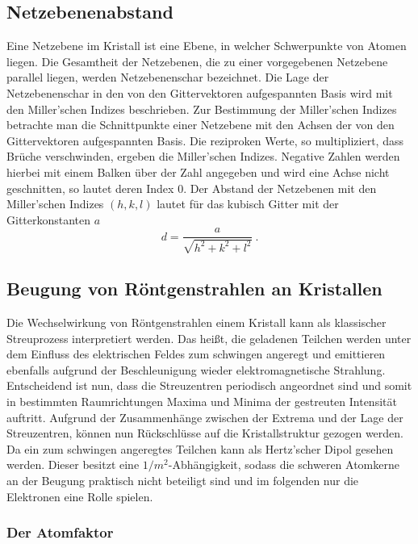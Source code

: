 \subsection{Netzebenenabstand}
\label{sub:netzebenenabstand}

Eine Netzebene im Kristall ist eine Ebene, in welcher Schwerpunkte von Atomen
liegen. Die Gesamtheit der Netzebenen, die zu einer vorgegebenen Netzebene
parallel liegen, werden Netzebenenschar bezeichnet. Die Lage der
Netzebenenschar in den von den Gittervektoren aufgespannten Basis wird mit den
Miller'schen Indizes beschrieben.
Zur Bestimmung der Miller'schen Indizes betrachte man die Schnittpunkte einer
Netzebene mit den Achsen der von den Gittervektoren aufgespannten Basis.
Die reziproken Werte, so multipliziert, dass Brüche verschwinden, ergeben die
Miller'schen Indizes. Negative Zahlen werden hierbei mit einem Balken über der
Zahl angegeben und wird eine Achse nicht geschnitten, so lautet deren Index 0.
Der Abstand der Netzebenen mit den Miller'schen Indizes $(h, k, l)$
lautet für das kubisch Gitter mit der Gitterkonstanten $a$
\begin{equation}
  d = \frac{a}{\sqrt{h^2 + k^2 + l^2}}~.
  \label{eq:gitterabstand}
\end{equation}

\subsection{Beugung von Röntgenstrahlen an Kristallen}
\label{sub:beugung_von_r_ntgenstrahlen_an_kristallen}

Die Wechselwirkung von Röntgenstrahlen einem Kristall kann als klassischer
Streuprozess interpretiert werden. Das heißt, die geladenen Teilchen werden
unter dem Einfluss des elektrischen Feldes zum schwingen angeregt und
emittieren ebenfalls aufgrund der Beschleunigung wieder elektromagnetische
Strahlung. Entscheidend ist nun, dass die Streuzentren periodisch angeordnet
sind und somit in bestimmten Raumrichtungen Maxima und Minima der gestreuten
Intensität auftritt. Aufgrund der Zusammenhänge zwischen der Extrema und der
Lage der Streuzentren, können nun Rückschlüsse auf die Kristallstruktur gezogen
werden. Da ein zum schwingen angeregtes Teilchen kann als Hertz'scher Dipol
gesehen werden. Dieser besitzt eine $1/m^2$-Abhängigkeit, sodass die schweren
Atomkerne an der Beugung praktisch nicht beteiligt sind und im folgenden nur
die Elektronen eine Rolle spielen.

\subsubsection{Der Atomfaktor}
\label{ssub:der_atomfaktor}

